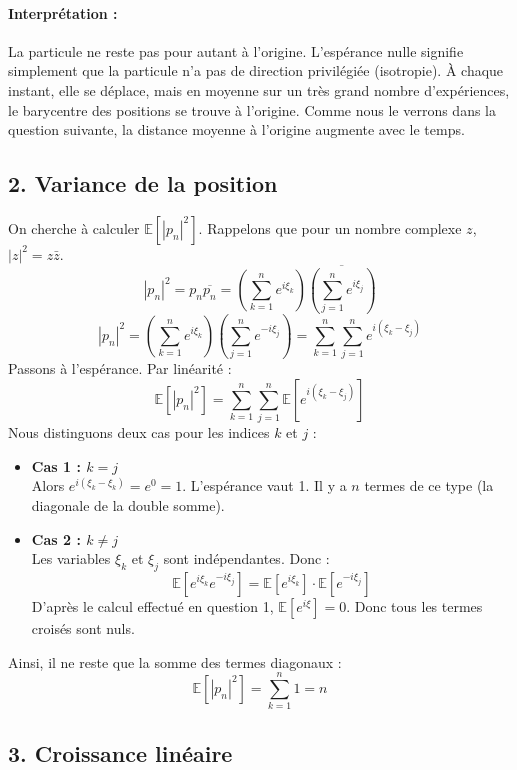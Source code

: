 \documentclass[12pt,a4paper]{report}
\begin{document}
\paragraph{Interprétation :} La particule ne reste pas pour autant à l'origine. L'espérance nulle signifie simplement que la particule n'a pas de direction privilégiée (isotropie). À chaque instant, elle se déplace, mais en moyenne sur un très grand nombre d'expériences, le barycentre des positions se trouve à l'origine. Comme nous le verrons dans la question suivante, la distance moyenne à l'origine augmente avec le temps.

\subsection*{2. Variance de la position}


On cherche à calculer $\mathbb{E}[|p_n|^2]$. Rappelons que pour un nombre complexe $z$, $|z|^2 = z \bar{z}$.
$$
|p_n|^2 = p_n \overline{p_n} = \left( \sum_{k=1}^{n} e^{i \xi_k} \right) \overline{\left( \sum_{j=1}^{n} e^{i \xi_j} \right)}
$$
$$
|p_n|^2 = \left( \sum_{k=1}^{n} e^{i \xi_k} \right) \left( \sum_{j=1}^{n} e^{-i \xi_j} \right) = \sum_{k=1}^{n} \sum_{j=1}^{n} e^{i(\xi_k - \xi_j)}
$$
Passons à l'espérance. Par linéarité :
$$
\mathbb{E}[|p_n|^2] = \sum_{k=1}^{n} \sum_{j=1}^{n} \mathbb{E}\left[ e^{i(\xi_k - \xi_j)} \right]
$$
Nous distinguons deux cas pour les indices $k$ et $j$ :

\begin{itemize}
    \item \textbf{Cas 1 : $k = j$} \\
    Alors $e^{i(\xi_k - \xi_k)} = e^0 = 1$. L'espérance vaut 1.
    Il y a $n$ termes de ce type (la diagonale de la double somme).

    \item \textbf{Cas 2 : $k \neq j$} \\
    Les variables $\xi_k$ et $\xi_j$ sont indépendantes. Donc :
    $$
    \mathbb{E}[e^{i \xi_k} e^{-i \xi_j}] = \mathbb{E}[e^{i \xi_k}] \cdot \mathbb{E}[e^{-i \xi_j}]
    $$
    D'après le calcul effectué en question 1, $\mathbb{E}[e^{i \xi}] = 0$. Donc tous les termes croisés sont nuls.
\end{itemize}

Ainsi, il ne reste que la somme des termes diagonaux :
$$
\mathbb{E}[|p_n|^2] = \sum_{k=1}^{n} 1 = n
$$

\subsection*{3. Croissance linéaire}
\end{document}
